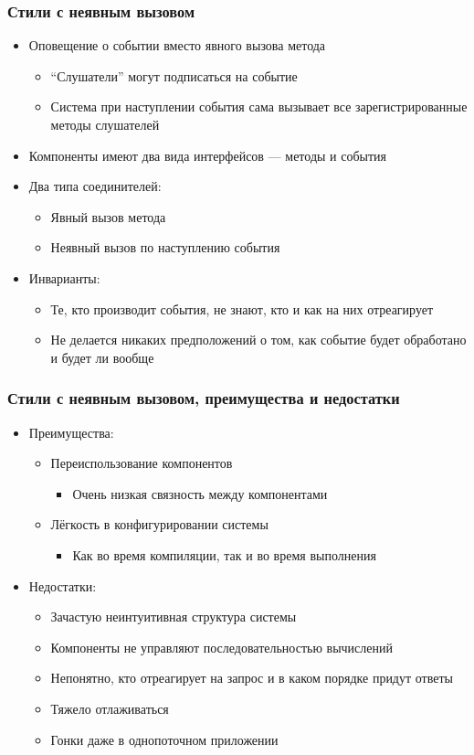 \documentclass[xetex,mathserif,serif]{beamer}
\begin{document}
	\begin{frame}
		\frametitle{Стили с неявным вызовом}
		\begin{itemize}
			\item Оповещение о событии вместо явного вызова метода
			\begin{itemize}
				\item ``Слушатели'' могут подписаться на событие
				\item Система при наступлении события сама вызывает все зарегистрированные методы слушателей
			\end{itemize}
			\item Компоненты имеют два вида интерфейсов --- методы и события
			\item Два типа соединителей:
			\begin{itemize}
				\item Явный вызов метода
				\item Неявный вызов по наступлению события
			\end{itemize}
			\item Инварианты:
			\begin{itemize}
				\item Те, кто производит события, не знают, кто и как на них отреагирует
				\item Не делается никаких предположений о том, как событие будет обработано и будет ли вообще
			\end{itemize}
		\end{itemize}
	\end{frame}

	\begin{frame}
		\frametitle{Стили с неявным вызовом, преимущества и недостатки}
		\begin{itemize}
			\item Преимущества:
			\begin{itemize}
				\item Переиспользование компонентов
				\begin{itemize}
					\item Очень низкая связность между компонентами
				\end{itemize}
				\item Лёгкость в конфигурировании системы
				\begin{itemize}
					\item Как во время компиляции, так и во время выполнения
				\end{itemize}
			\end{itemize}
			\item Недостатки:
			\begin{itemize}
				\item Зачастую неинтуитивная структура системы
				\item Компоненты не управляют последовательностью вычислений
				\item Непонятно, кто отреагирует на запрос и в каком порядке придут ответы
				\item Тяжело отлаживаться
				\item Гонки даже в однопоточном приложении
			\end{itemize}
		\end{itemize}
	\end{frame}
\end{document}
